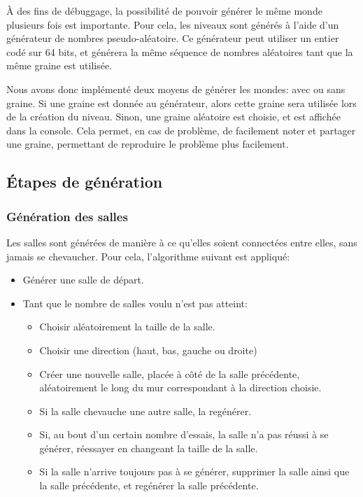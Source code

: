 \documentclass[10pt]{report}
\begin{document}
À des fins de débuggage, la possibilité de pouvoir générer le même monde
plusieurs fois est importante. Pour cela, les niveaux sont générés à l'aide
d'un générateur de nombres pseudo-aléatoire. Ce générateur peut utiliser
un entier codé sur 64 bits, et générera la même séquence de nombres
aléatoires tant que la même graine est utilisée. 

Nous avons donc implémenté
deux moyens de générer les mondes: avec ou sans graine. Si une graine est
donnée au générateur, alors cette graine sera utilisée lors de la création
du niveau. Sinon, une graine aléatoire est choisie, et est affichée dans
la console. Cela permet, en cas de problème, de facilement noter et partager
une graine, permettant de reproduire le problème plus facilement.

\subsection{Étapes de génération}
\subsubsection{Génération des salles}

Les salles sont générées de manière à ce qu'elles soient connectées entre
elles, sans jamais se chevaucher. Pour cela, l'algorithme suivant est 
appliqué:

\begin{itemize}
  \item Générer une salle de départ.
  \item Tant que le nombre de salles voulu n'est pas atteint:
  \begin{itemize}
    \item Choisir aléatoirement la taille de la salle.
    \item Choisir une direction (haut, bas, gauche ou droite)
    \item Créer une nouvelle salle, placée à côté de la salle précédente,
    aléatoirement le long du mur correspondant à la direction choisie.
    \item Si la salle chevauche une autre salle, la regénérer.
    \item Si, au bout d'un certain nombre d'essais, la salle n'a pas réussi
    à se générer, réessayer en changeant la taille de la salle.
    \item Si la salle n'arrive toujours pas à se générer, supprimer la
    salle ainsi que la salle précédente, et regénérer la salle précédente.
  \end{itemize}
\end{itemize}
\end{document}
